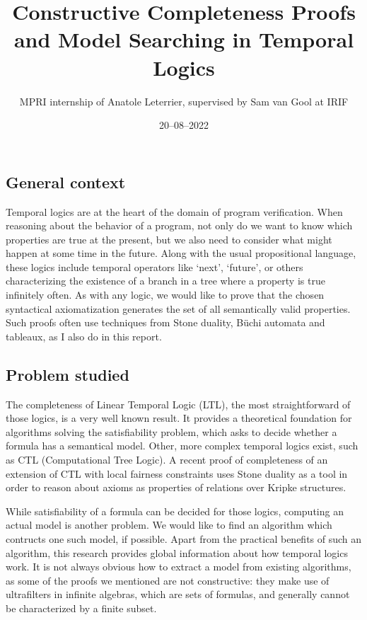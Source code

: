 \documentclass[11pt]{article}
\title{Constructive Completeness Proofs and Model Searching in Temporal Logics}
\author{MPRI internship of Anatole Leterrier, supervised by Sam van Gool at IRIF}
\date{20--08--2022}
\theoremstyle{definition}
\begin{document}
\maketitle

\section*{}

\subsection*{General context}
Temporal logics are at the heart of the domain of program verification.
When reasoning about the behavior of a program, not only do we want 
to know which properties are true at the present, but we also need 
to consider what might happen at some time in the future.
Along with the usual propositional language, these logics include
temporal operators like `next', `future', or others characterizing
the existence of a branch in a tree where a property is true
infinitely often.
As  with any logic, we would like to prove that the chosen syntactical
axiomatization generates the set of all semantically valid properties.
Such proofs often use techniques from Stone duality, Büchi automata and
tableaux, as I also do in this report.

\subsection*{Problem studied}
The completeness of Linear Temporal Logic (LTL), the most straightforward
of those logics, is a very well known result. It provides a
theoretical foundation for algorithms solving
the satisfiability problem, which asks to decide whether a formula
has a semantical model. Other, more complex temporal logics exist, such 
as CTL (Computational Tree Logic). A recent proof of completeness 
of an extension of CTL with local fairness constraints \cite{GhivG16} 
uses Stone duality as a tool in order to
reason about axioms as properties of relations over Kripke structures. 

While satisfiability of a formula can be decided for those logics, computing
an actual model is another problem. We would like to find an algorithm
which contructs one such model, if possible. Apart from the practical
benefits of such an algorithm, this research provides global information 
about how temporal logics work. It is not always obvious how to extract
a model from existing algorithms, as some of
the proofs we mentioned are not constructive: they make use of
ultrafilters in infinite algebras, which are sets of formulas, and
generally cannot be characterized by a finite subset.
\end{document}
